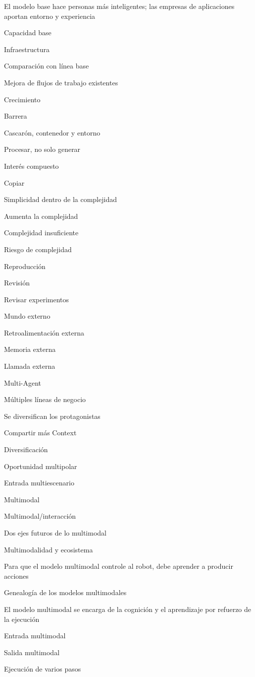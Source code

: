 \documentclass{article}
\begin{document}
El modelo base hace personas más inteligentes; las empresas de aplicaciones aportan entorno y experiencia

Capacidad base

Infraestructura

Comparación con línea base

Mejora de flujos de trabajo existentes

Crecimiento

Barrera

Cascarón, contenedor y entorno

Procesar, no solo generar

Interés compuesto

Copiar

Simplicidad dentro de la complejidad

Aumenta la complejidad

Complejidad insuficiente

Riesgo de complejidad

Reproducción

Revisión

Revisar experimentos

Mundo externo

Retroalimentación externa

Memoria externa

Llamada externa

Multi-Agent

Múltiples líneas de negocio

Se diversifican los protagonistas

Compartir más Context

Diversificación

Oportunidad multipolar

Entrada multiescenario

Multimodal

Multimodal/interacción

Dos ejes futuros de lo multimodal

Multimodalidad y ecosistema

Para que el modelo multimodal controle al robot, debe aprender a producir acciones

Genealogía de los modelos multimodales

El modelo multimodal se encarga de la cognición y el aprendizaje por refuerzo de la ejecución

Entrada multimodal

Salida multimodal

Ejecución de varios pasos
\end{document}
